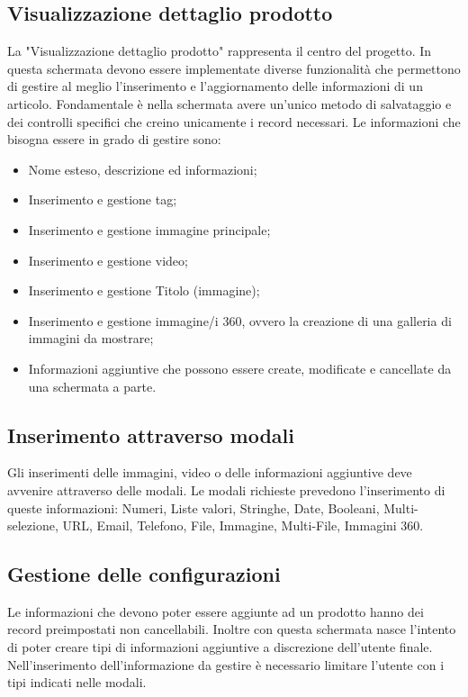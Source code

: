 \subsection{Visualizzazione dettaglio prodotto}
La "Visualizzazione dettaglio prodotto" rappresenta il centro del progetto. In questa schermata devono essere implementate diverse funzionalità che permettono di gestire al meglio l'inserimento e l'aggiornamento delle informazioni di un articolo. Fondamentale è nella schermata avere un'unico metodo di salvataggio e dei controlli specifici che creino unicamente i record necessari. 
Le informazioni che bisogna essere in grado di gestire sono:
\begin{itemize}
	\item Nome esteso, descrizione ed informazioni;
	\item Inserimento e gestione tag;
	\item Inserimento e gestione immagine principale;
	\item Inserimento e gestione video;
	\item Inserimento e gestione Titolo (immagine);
	\item Inserimento e gestione immagine/i 360, ovvero la creazione di una galleria di immagini da mostrare;
	\item Informazioni aggiuntive che possono essere create, modificate e cancellate da una schermata a parte.
\end{itemize}

\subsection{Inserimento attraverso modali}
Gli inserimenti delle immagini, video o delle informazioni aggiuntive deve avvenire attraverso delle modali. Le modali richieste prevedono l'inserimento di queste informazioni: Numeri, Liste valori, Stringhe, Date, Booleani, Multi-selezione, URL, Email, Telefono, File, Immagine, Multi-File, Immagini 360.

\subsection{Gestione delle configurazioni}
Le informazioni che devono poter essere aggiunte ad un prodotto hanno dei record preimpostati non cancellabili. Inoltre con questa schermata nasce l'intento di poter creare tipi di informazioni aggiuntive a discrezione dell'utente finale.
Nell'inserimento dell'informazione da gestire è necessario limitare l'utente con i tipi indicati nelle modali.

